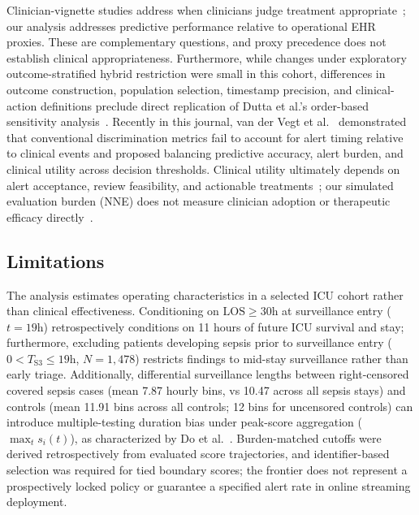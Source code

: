 \documentclass[12pt,a4paper]{article}
\begin{document}
Clinician-vignette studies address when clinicians judge treatment appropriate~\cite{weissman2024sepsis}; our analysis addresses predictive performance relative to operational EHR proxies. These are complementary questions, and proxy precedence does not establish clinical appropriateness. Furthermore, while changes under exploratory outcome-stratified hybrid restriction were small in this cohort, differences in outcome construction, population selection, timestamp precision, and clinical-action definitions preclude direct replication of Dutta et al.'s order-based sensitivity analysis~\cite{dutta2026performance}. Recently in this journal, van der Vegt et al.~\cite{vandervegt2026novel} demonstrated that conventional discrimination metrics fail to account for alert timing relative to clinical events and proposed balancing predictive accuracy, alert burden, and clinical utility across decision thresholds. Clinical utility ultimately depends on alert acceptance, review feasibility, and actionable treatments~\cite{ancker2017effects,henry2022factors}; our simulated evaluation burden (NNE) does not measure clinician adoption or therapeutic efficacy directly~\cite{paine2016systematic}.

\subsection{Limitations}
The analysis estimates operating characteristics in a selected ICU cohort rather than clinical effectiveness. Conditioning on $\text{LOS} \ge 30\text{h}$ at surveillance entry ($t=19\text{h}$) retrospectively conditions on 11 hours of future ICU survival and stay; furthermore, excluding patients developing sepsis prior to surveillance entry ($0 < T_{\text{S3}} \le 19\text{h}$, $N=1,478$) restricts findings to mid-stay surveillance rather than early triage. Additionally, differential surveillance lengths between right-censored covered sepsis cases (mean 7.87 hourly bins, vs 10.47 across all sepsis stays) and controls (mean 11.91 bins across all controls; 12 bins for uncensored controls) can introduce multiple-testing duration bias under peak-score aggregation ($\max_t s_i(t)$), as characterized by Do et al.~\cite{do2026continuous}. Burden-matched cutoffs were derived retrospectively from evaluated score trajectories, and identifier-based selection was required for tied boundary scores; the frontier does not represent a prospectively locked policy or guarantee a specified alert rate in online streaming deployment.
\end{document}
